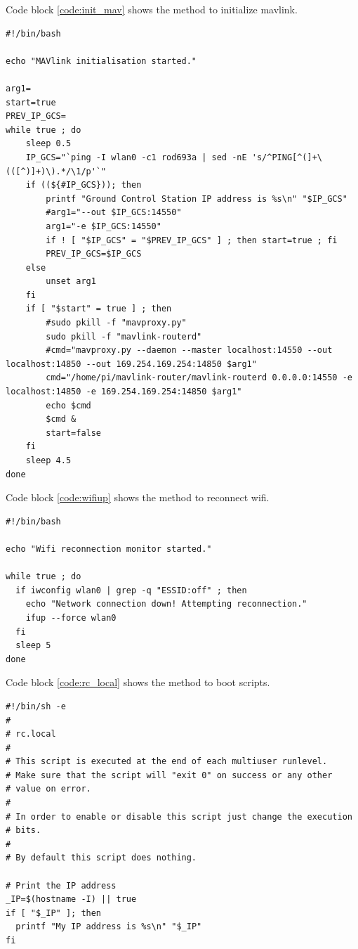 \begin{appendices}
Code block \ref{code:init_mav} shows the method to initialize mavlink.

\begin{lstlisting}
#!/bin/bash

echo "MAVlink initialisation started."

arg1=
start=true
PREV_IP_GCS=
while true ; do
	sleep 0.5
	IP_GCS="`ping -I wlan0 -c1 rod693a | sed -nE 's/^PING[^(]+\(([^)]+)\).*/\1/p'`"
	if ((${#IP_GCS})); then
		printf "Ground Control Station IP address is %s\n" "$IP_GCS"
		#arg1="--out $IP_GCS:14550"
		arg1="-e $IP_GCS:14550"
		if ! [ "$IP_GCS" = "$PREV_IP_GCS" ] ; then start=true ; fi
		PREV_IP_GCS=$IP_GCS
	else
		unset arg1
	fi
	if [ "$start" = true ] ; then
		#sudo pkill -f "mavproxy.py"
		sudo pkill -f "mavlink-routerd"
		#cmd="mavproxy.py --daemon --master localhost:14550 --out localhost:14850 --out 169.254.169.254:14850 $arg1"
		cmd="/home/pi/mavlink-router/mavlink-routerd 0.0.0.0:14550 -e localhost:14850 -e 169.254.169.254:14850 $arg1"
		echo $cmd
		$cmd &
		start=false
	fi
	sleep 4.5
done

\end{lstlisting}

Code block \ref{code:wifiup} shows the method to reconnect wifi.

\begin{lstlisting}
#!/bin/bash

echo "Wifi reconnection monitor started."

while true ; do
  if iwconfig wlan0 | grep -q "ESSID:off" ; then
    echo "Network connection down! Attempting reconnection."
    ifup --force wlan0
  fi
  sleep 5
done

\end{lstlisting}

Code block \ref{code:rc_local} shows the method to boot scripts.

\begin{lstlisting}
#!/bin/sh -e
#
# rc.local
#
# This script is executed at the end of each multiuser runlevel.
# Make sure that the script will "exit 0" on success or any other
# value on error.
#
# In order to enable or disable this script just change the execution
# bits.
#
# By default this script does nothing.

# Print the IP address
_IP=$(hostname -I) || true
if [ "$_IP" ]; then
  printf "My IP address is %s\n" "$_IP"
fi


\end{lstlisting}
\end{appendices}

